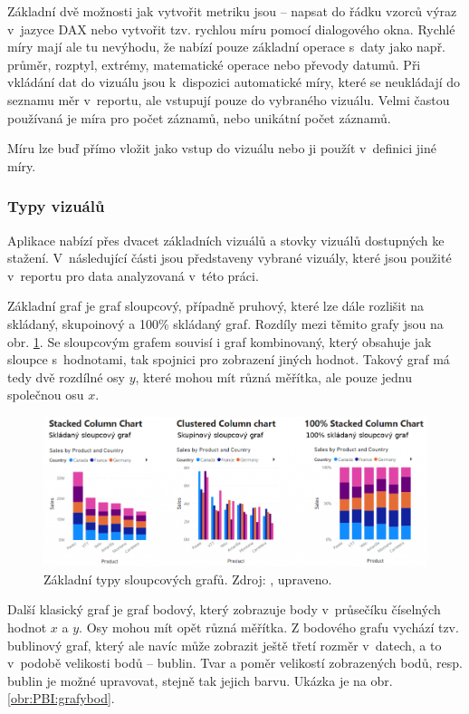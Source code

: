 Základní dvě možnosti jak vytvořit metriku jsou -- napsat do řádku vzorců výraz v~jazyce DAX nebo vytvořit tzv. rychlou míru pomocí dialogového okna. Rychlé míry mají ale tu nevýhodu, že nabízí pouze základní operace s~daty jako např. průměr, rozptyl, extrémy, matematické operace nebo převody datumů. 
Při vkládání dat do vizuálu jsou k~dispozici automatické míry, které se neukládají do seznamu měr v~reportu, ale vstupují pouze do vybraného vizuálu. Velmi častou používaná je míra pro počet záznamů, nebo unikátní počet záznamů.

Míru lze buď přímo vložit jako vstup do vizuálu nebo ji použít v~definici jiné míry.

\subsubsection*{Typy vizuálů}

Aplikace nabízí přes dvacet základních vizuálů a stovky vizuálů dostupných ke stažení. V~následující části jsou představeny vybrané vizuály, které jsou použité v~reportu pro data analyzovaná v~této práci. 

Základní graf je graf sloupcový, případně pruhový, které lze dále rozlišit na skládaný, skupoinový a 100\% skládaný graf. Rozdíly mezi těmito grafy jsou na obr. \ref*{obr:PBI:grafy}. Se sloupcovým grafem souvisí i graf kombinovaný, který obsahuje jak sloupce s~hodnotami, tak spojnici pro zobrazení jiných hodnot. Takový graf má tedy dvě rozdílné osy $y$, které mohou mít různá měřítka, ale pouze jednu společnou osu $x$.

\begin{figure}[h!]
    \centering
    \captionsetup{justification=centering}
    \includegraphics[width=\textwidth]{obrazky/PBIteorie/sloupcove_grafy.png}
    \caption{Základní typy sloupcových grafů. 
    Zdroj: \cite{bib:PBIgrafy}, upraveno.}
    \label{obr:PBI:grafy}
\end{figure}

Další klasický graf je graf bodový, který zobrazuje body v~průsečíku číselných hodnot $x$  a $y$. Osy mohou mít opět různá měřítka. Z bodového grafu vychází tzv. bublinový graf, který ale navíc může zobrazit ještě třetí rozměr v~datech, a to v~podobě velikosti bodů -- bublin. Tvar a poměr velikostí zobrazených bodů, resp. bublin je možné upravovat, stejně tak jejich barvu. Ukázka je na obr. \ref*{obr:PBI:grafybod}.

